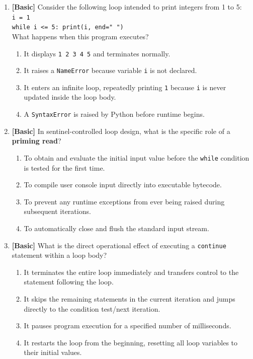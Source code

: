 \documentclass[11pt,a4paper]{article}
\begin{document}
\begin{enumerate}[label=\textbf{Q\arabic*.},leftmargin=1.8em,itemsep=0.6pt,topsep=0.2pt]
\item \textbf{[Basic]} Consider the following loop intended to print integers from 1 to 5:\\
\texttt{i = 1}\\
\texttt{while i <= 5: print(i, end=" ")}\\
What happens when this program executes?
\begin{enumerate}[label=\Alph*.,leftmargin=1.8em]
  \item It displays \texttt{1 2 3 4 5} and terminates normally.
  \item It raises a \texttt{NameError} because variable \texttt{i} is not declared.
  \item It enters an infinite loop, repeatedly printing \texttt{1} because \texttt{i} is never updated inside the loop body.
  \item A \texttt{SyntaxError} is raised by Python before runtime begins.
\end{enumerate}

\item \textbf{[Basic]} In sentinel-controlled loop design, what is the specific role of a \textbf{priming read}?
\begin{enumerate}[label=\Alph*.,leftmargin=1.8em]
  \item To obtain and evaluate the initial input value before the \texttt{while} condition is tested for the first time.
  \item To compile user console input directly into executable bytecode.
  \item To prevent any runtime exceptions from ever being raised during subsequent iterations.
  \item To automatically close and flush the standard input stream.
\end{enumerate}

\item \textbf{[Basic]} What is the direct operational effect of executing a \texttt{continue} statement within a loop body?
\begin{enumerate}[label=\Alph*.,leftmargin=1.8em]
  \item It terminates the entire loop immediately and transfers control to the statement following the loop.
  \item It skips the remaining statements in the current iteration and jumps directly to the condition test/next iteration.
  \item It pauses program execution for a specified number of milliseconds.
  \item It restarts the loop from the beginning, resetting all loop variables to their initial values.
\end{enumerate}

\end{enumerate}
\end{document}

